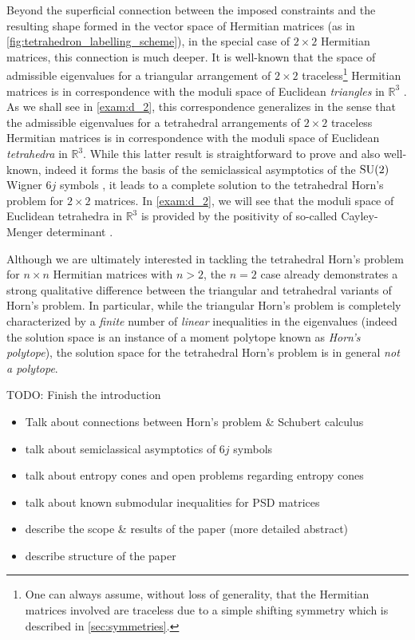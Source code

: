 \documentclass[notitlepage, 10pt]{article}
\begin{document}
Beyond the superficial connection between the imposed constraints and the resulting shape formed in the vector space of Hermitian matrices (as in \cref{fig:tetrahedron_labelling_scheme}), in the special case of $2\times 2$ Hermitian matrices, this connection is much deeper.
It is well-known that the space of admissible eigenvalues for a triangular arrangement of $2\times 2$ traceless\footnote{One can always assume, without loss of generality, that the Hermitian matrices involved are traceless due to a simple shifting symmetry which is described in \cref{sec:symmetries}.} Hermitian matrices is in correspondence with the moduli space of Euclidean \textit{triangles} in $\mathbb R^{3}$ \cite{hausmann1996polygon,freidel2010holomorphic,knutson2000symplectic}.
As we shall see in \cref{exam:d_2}, this correspondence generalizes in the sense that the admissible eigenvalues for a tetrahedral arrangements of $2\times 2$ traceless Hermitian matrices is in correspondence with the moduli space of Euclidean \textit{tetrahedra} in $\mathbb R^{3}$.
While this latter result is straightforward to prove and also well-known, indeed it forms the basis of the semiclassical asymptotics of the $\operatorname{SU}(2)$ Wigner $6j$ symbols \cite{roberts1999classical}, it leads to a complete solution to the tetrahedral Horn's problem for $2\times 2$ matrices.
In \cref{exam:d_2}, we will see that the moduli space of Euclidean tetrahedra in $\mathbb R^3$ is provided by the positivity of so-called Cayley-Menger determinant \cite{sitharam2018handbook}.

Although we are ultimately interested in tackling the tetrahedral Horn's problem for $n\times n$ Hermitian matrices with $n > 2$, the $n=2$ case already demonstrates a strong qualitative difference between the triangular and tetrahedral variants of Horn's problem.
In particular, while the triangular Horn's problem is completely characterized by a \textit{finite} number of \textit{linear} inequalities in the eigenvalues (indeed the solution space is an instance of a moment polytope known as \textit{Horn's polytope}), the solution space for the tetrahedral Horn's problem is in general \textit{not a polytope}.

{\color{red}
    TODO: Finish the introduction
    \begin{itemize}
        \item Talk about connections between Horn's problem \& Schubert calculus
        \item talk about semiclassical asymptotics of $6j$ symbols
        \item talk about entropy cones and open problems regarding entropy cones
        \item talk about known submodular inequalities for PSD matrices
        \item describe the scope \& results of the paper (more detailed abstract)
        \item describe structure of the paper
    \end{itemize}
}
\end{document}
